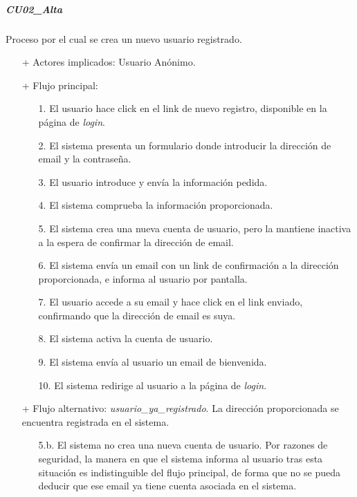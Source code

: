 \documentclass[a4paper]{article}
\begin{document}
            \subparagraph{CU02\_Alta}
            Proceso por el cual se crea un nuevo usuario registrado.
            \begin{itemize}
                \item[+] Actores implicados: Usuario Anónimo.
                \item[+] Flujo principal:
                \begin{enumerate}
                    \item[1.] El usuario hace click en el link de nuevo registro, disponible en la página de \emph{login}.
                    \item[2.] El sistema presenta un formulario donde introducir la dirección de email y la contraseña.
                    \item[3.] El usuario introduce y envía la información pedida.
                    \item[4.] El sistema comprueba la información proporcionada.
                    \item[5.] El sistema crea una nueva cuenta de usuario, pero la mantiene inactiva a la espera de confirmar la dirección de email.
                    \item[6.] El sistema envía un email con un link de confirmación a la dirección proporcionada, e informa al usuario por pantalla.
                    \item[7.] El usuario accede a su email y hace click en el link enviado, confirmando que la dirección de email es suya.
                    \item[8.] El sistema activa la cuenta de usuario.
                    \item[9.] El sistema envía al usuario un email de bienvenida.
                    \item[10.] El sistema redirige al usuario a la página de \emph{login}.
                \end{enumerate}
                \item[+] Flujo alternativo: \emph{usuario\_ya\_registrado}. La dirección proporcionada se encuentra registrada en el sistema.
                \begin{itemize}
                    \item[5.b.] El sistema no crea una nueva cuenta de usuario. Por razones de seguridad, la manera en que el sistema informa al usuario tras esta situación es indistinguible del flujo principal, de forma que no se pueda deducir que ese email ya tiene cuenta asociada en el sistema.
                \end{itemize}

\end{itemize}
\end{document}
